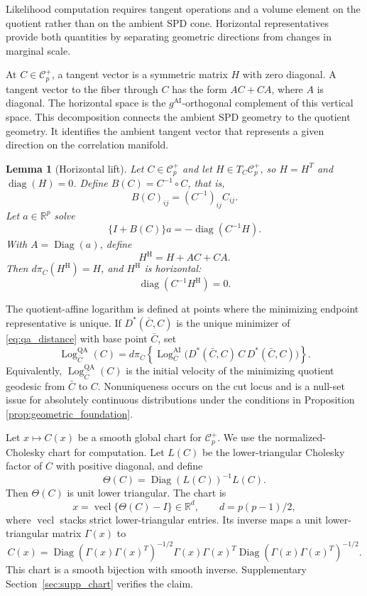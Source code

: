 \documentclass[
  12pt]{article}
\newcommand{\Corr}{\mathcal C^+}
\newcommand{\diag}{\operatorname{diag}}
\newcommand{\Diag}{\operatorname{Diag}}
\newcommand{\vecl}{\operatorname{vecl}}
\newcommand{\Log}{\operatorname{Log}}
\newcommand{\R}{\mathbb R}
\newcommand{\QA}{\mathrm{QA}}
\newcommand{\AI}{\mathrm{AI}}
\newcommand{\Had}{\circ}
\newtheorem{lemma}{Lemma}
\begin{document}
Likelihood computation requires tangent operations and a volume element on the quotient rather than on the ambient SPD cone. Horizontal representatives provide both quantities by separating geometric directions from changes in marginal scale.

At $C\in\Corr_p$, a tangent vector is a symmetric matrix $H$ with zero diagonal. A tangent vector to the fiber through $C$ has the form $AC+CA$, where $A$ is diagonal. The horizontal space is the $g^{\AI}$-orthogonal complement of this vertical space. This decomposition connects the ambient SPD geometry to the quotient geometry. It identifies the ambient tangent vector that represents a given direction on the correlation manifold.

\begin{lemma}[Horizontal lift]\label{lem:horizontal_lift}
Let $C\in\Corr_p$ and let $H\in T_C\Corr_p$, so $H=H^T$ and $\diag(H)=0$. Define $B(C)=C^{-1}\Had C$, that is,
\[
B(C)_{ij}=(C^{-1})_{ij}C_{ij}.
\]
Let $a\in\R^p$ solve
\[
\{I+B(C)\}a=-\diag(C^{-1}H).
\]
With $A=\Diag(a)$, define
\[
H^{\mathrm H}=H+AC+CA.
\]
Then $d\pi_C(H^{\mathrm H})=H$, and $H^{\mathrm H}$ is horizontal:
\[
\diag(C^{-1}H^{\mathrm H})=0.
\]
\end{lemma}

The quotient-affine logarithm is defined at points where the minimizing endpoint representative is unique. If $D^*(\bar C,C)$ is the unique minimizer of \eqref{eq:qa_distance} with base point $\bar C$, set
\begin{equation}\label{eq:qa_log_definition}
\Log^{\QA}_{\bar C}(C)=d\pi_{\bar C}\left\{\Log^{\AI}_{\bar C}\bigl(D^*(\bar C,C)\,C\,D^*(\bar C,C)\bigr)\right\}.
\end{equation}
Equivalently, $\Log^{\QA}_{\bar C}(C)$ is the initial velocity of the minimizing quotient geodesic from $\bar C$ to $C$. Nonuniqueness occurs on the cut locus and is a null-set issue for absolutely continuous distributions under the conditions in Proposition \ref{prop:geometric_foundation}.

Let $x\mapsto C(x)$ be a smooth global chart for $\Corr_p$. We use the normalized-Cholesky chart for computation. Let $L(C)$ be the lower-triangular Cholesky factor of $C$ with positive diagonal, and define
\[
\Theta(C)=\Diag(L(C))^{-1}L(C).
\]
Then $\Theta(C)$ is unit lower triangular. The chart is
\begin{equation}\label{eq:cholesky_chart}
x=\vecl\{\Theta(C)-I\}\in\R^d,
\qquad d=p(p-1)/2,
\end{equation}
where $\vecl$ stacks strict lower-triangular entries. Its inverse maps a unit lower-triangular matrix $\Gamma(x)$ to
\begin{equation}\label{eq:cholesky_chart_inverse}
C(x)=\Diag(\Gamma(x)\Gamma(x)^T)^{-1/2}\Gamma(x)\Gamma(x)^T\Diag(\Gamma(x)\Gamma(x)^T)^{-1/2}.
\end{equation}
This chart is a smooth bijection with smooth inverse. Supplementary Section~\ref{sec:supp_chart} verifies the claim.
\end{document}
